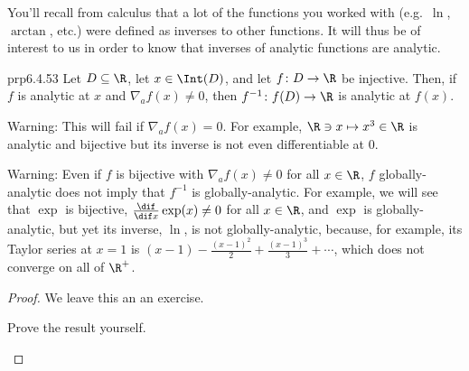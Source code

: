 You'll recall from calculus that a lot of the functions you worked with (e.g.~$\ln$, $\arctan$, etc.) were defined as inverses to other functions.  It will thus be of interest to us in order to know that inverses of analytic functions are analytic.
\begin{prp}{}{prp6.4.53}
Let $D\subseteq \R$, let $x\in \Int (D)$, and let $f\colon D\rightarrow \R$ be injective.  Then, if $f$ is analytic at $x$ and $\nabla _af(x)\neq 0$, then $f^{-1}\colon f(D)\rightarrow \R$ is analytic at $f(x)$.
\begin{wrn}
Warning:  This will fail if $\nabla _af(x)=0$.  For example, $\R \ni x\mapsto x^3\in \R$ is analytic and bijective but its inverse is not even differentiable at $0$.
\end{wrn}
\begin{wrn}
Warning:  Even if $f$ is bijective with $\nabla _af(x)\neq 0$ for all $x\in \R$, $f$ globally-analytic does not imply that $f^{-1}$ is globally-analytic.  For example, we will see that $\exp$ is bijective, $\frac{\dif}{\dif x}\exp (x)\neq 0$ for all $x\in \R$, and $\exp$ is globally-analytic, but yet its inverse, $\ln$, is not globally-analytic, because, for example, its Taylor series at $x=1$ is $(x-1)-\frac{(x-1)^2}{2}+\frac{(x-1)^3}{3}+\cdots$, which does not converge on all of $\R ^+$.
\end{wrn}
\begin{proof}
We leave this an an exercise.
\begin{exr}[breakable=false]{}{}
Prove the result yourself.
\end{exr}
\end{proof}
\end{prp}

\horizontalrule

